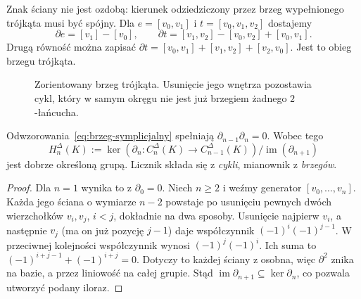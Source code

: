 Znak ściany nie jest ozdobą: kierunek odziedziczony
przez brzeg wypełnionego trójkąta musi być spójny.
Dla $e=[v_0,v_1]$ i $t=[v_0,v_1,v_2]$ dostajemy
\[
 \partial e=[v_1]-[v_0],\qquad
 \partial t=[v_1,v_2]-[v_0,v_2]+[v_0,v_1].
\]
Drugą równość można zapisać
$\partial t=[v_0,v_1]+[v_1,v_2]+[v_2,v_0]$.
Jest to obieg brzegu trójkąta.

\begin{figure}[!htbp]
\centering
{}
\caption{Zorientowany brzeg trójkąta. Usunięcie jego
wnętrza pozostawia cykl, który w samym okręgu
nie jest już brzegiem żadnego $2$-łańcucha.}
\label{fig:homologia-trojkat}
\end{figure}

\begin{twierdzenie}
\label{thm:brzeg-brzegu}
Odwzorowania~\eqref{eq:brzeg-symplicjalny}
spełniają $\partial_{n-1}\partial_n=0$.
Wobec tego
\[
 H_n^\Delta(K):=
 \ker(\partial_n:C_n^\Delta(K)\to C_{n-1}^\Delta(K))
 \big/
 \operatorname{im}(\partial_{n+1})
\]
jest dobrze określoną grupą. Licznik składa
się z \emph{cykli}, mianownik z \emph{brzegów}.
\end{twierdzenie}
\begin{proof}
Dla $n=1$ wynika to z $\partial_0=0$.
Niech $n\geq2$ i weźmy generator
$[v_0,\ldots,v_n]$. Każda jego ściana
o wymiarze $n-2$ powstaje po usunięciu
pewnych dwóch wierzchołków $v_i,v_j$,
$i<j$, dokładnie na dwa sposoby.
Usunięcie najpierw $v_i$, a następnie
$v_j$ (ma on już pozycję $j-1$) daje
współczynnik $(-1)^i(-1)^{j-1}$.
W przeciwnej kolejności współczynnik
wynosi $(-1)^j(-1)^i$.
Ich suma to
$(-1)^{i+j-1}+(-1)^{i+j}=0$.
Dotyczy to każdej ściany z osobna,
więc $\partial^2$ znika na bazie,
a przez liniowość na całej grupie.
Stąd $\operatorname{im}\partial_{n+1}
\subseteq\ker\partial_n$, co pozwala
utworzyć podany iloraz.
\end{proof}

